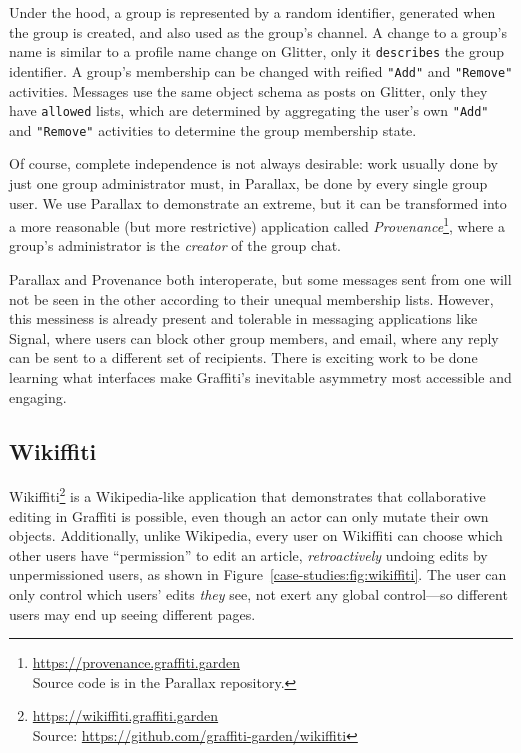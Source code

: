 Under the hood, a group is represented by a random identifier,
generated when the group is created, and also used as the group's channel.
A change to a group's name is similar to a profile name change on Glitter, only it
\texttt{describes} the group identifier.
A group's membership can be changed with reified \texttt{"Add"}
and \texttt{"Remove"} activities.
Messages use the same object schema as posts on Glitter,
only they have \texttt{allowed} lists, which are determined
by aggregating the user's own \texttt{"Add"} and \texttt{"Remove"} activities
to determine the group membership state.

Of course, complete independence is not always desirable:
work usually done by just one group administrator must, in Parallax,
be done by every single group user.
We use Parallax to demonstrate an extreme,
but it can be
transformed into a more reasonable (but more restrictive) application called \emph{Provenance}\footnote{
\url{https://provenance.graffiti.garden}\\Source code is in the Parallax repository.
},
where a group's administrator is the \emph{creator} of the group chat.

Parallax and Provenance both interoperate,
but some messages sent from one will not be seen in the other
according to their unequal membership lists. However, this messiness is already present and tolerable
in messaging applications like Signal, where users can block other group members,
and email, where any reply can be sent to a different set of recipients.
There is exciting work to be done learning what interfaces make
Graffiti's inevitable asymmetry most accessible and engaging.

\subsection{Wikiffiti}
\label{case-studies:wikiffiti}

Wikiffiti\footnote{
\url{https://wikiffiti.graffiti.garden}\\Source: \url{https://github.com/graffiti-garden/wikiffiti}
} is a Wikipedia-like application that demonstrates that
collaborative editing in Graffiti is possible,
even though an actor can only mutate their own objects.
Additionally, unlike Wikipedia,
every user on Wikiffiti can choose which other users have ``permission'' to edit an article,
\emph{retroactively} undoing edits by unpermissioned users,
as shown in Figure~\ref{case-studies:fig:wikiffiti}.
The user can only control which users' edits \emph{they} see, not exert any global control---so different users may end up seeing different pages.

